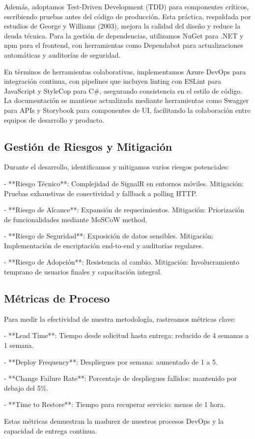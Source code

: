Además, adoptamos Test-Driven Development (TDD) para componentes críticos, escribiendo pruebas antes del código de producción. Esta práctica, respaldada por estudios de George y Williams (2003), mejora la calidad del diseño y reduce la deuda técnica. Para la gestión de dependencias, utilizamos NuGet para .NET y npm para el frontend, con herramientas como Dependabot para actualizaciones automáticas y auditorías de seguridad.

En términos de herramientas colaborativas, implementamos Azure DevOps para integración continua, con pipelines que incluyen linting con ESLint para JavaScript y StyleCop para C#, asegurando consistencia en el estilo de código. La documentación se mantiene actualizada mediante herramientas como Swagger para APIs y Storybook para componentes de UI, facilitando la colaboración entre equipos de desarrollo y producto.

\subsection{Gestión de Riesgos y Mitigación}

Durante el desarrollo, identificamos y mitigamos varios riesgos potenciales:

- **Riesgo Técnico**: Complejidad de SignalR en entornos móviles. Mitigación: Pruebas exhaustivas de conectividad y fallback a polling HTTP.

- **Riesgo de Alcance**: Expansión de requerimientos. Mitigación: Priorización de funcionalidades mediante MoSCoW method.

- **Riesgo de Seguridad**: Exposición de datos sensibles. Mitigación: Implementación de encriptación end-to-end y auditorías regulares.

- **Riesgo de Adopción**: Resistencia al cambio. Mitigación: Involucramiento temprano de usuarios finales y capacitación integral.

\subsection{Métricas de Proceso}

Para medir la efectividad de nuestra metodología, rastreamos métricas clave:

- **Lead Time**: Tiempo desde solicitud hasta entrega: reducido de 4 semanas a 1 semana.

- **Deploy Frequency**: Despliegues por semana: aumentado de 1 a 5.

- **Change Failure Rate**: Porcentaje de despliegues fallidos: mantenido por debajo del 5\%.

- **Time to Restore**: Tiempo para recuperar servicio: menos de 1 hora.

Estas métricas demuestran la madurez de nuestros procesos DevOps y la capacidad de entrega continua.